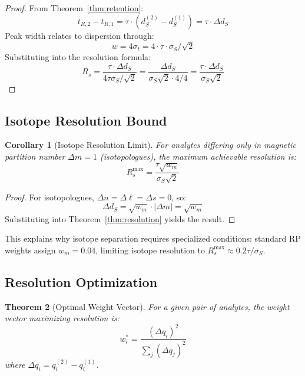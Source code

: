 \documentclass[twocolumn,10pt]{article}
\newtheorem{theorem}{Theorem}[section]
\newtheorem{corollary}[theorem]{Corollary}
\begin{document}
\begin{proof}
From Theorem~\ref{thm:retention}:
\begin{equation}
t_{R,2} - t_{R,1} = \tau \cdot (d_S^{(2)} - d_S^{(1)}) = \tau \cdot \Delta d_S
\end{equation}
Peak width relates to dispersion through:
\begin{equation}
w = 4\sigma_t = 4 \cdot \tau \cdot \sigma_S / \sqrt{2}
\end{equation}
Substituting into the resolution formula:
\begin{equation}
R_s = \frac{\tau \cdot \Delta d_S}{4 \tau \sigma_S / \sqrt{2}} = \frac{\Delta d_S}{\sigma_S \sqrt{2} \cdot 4/4} = \frac{\tau \cdot \Delta d_S}{\sigma_S \sqrt{2}}
\end{equation}
\end{proof}

\subsection{Isotope Resolution Bound}

\begin{corollary}[Isotope Resolution Limit]
\label{cor:isotope}
For analytes differing only in magnetic partition number $\Delta m = 1$ (isotopologues), the maximum achievable resolution is:
\begin{equation}
R_s^{\max} = \frac{\tau \sqrt{w_m}}{\sigma_S \sqrt{2}}
\end{equation}
\end{corollary}

\begin{proof}
For isotopologues, $\Delta n = \Delta \ell = \Delta s = 0$, so:
\begin{equation}
\Delta d_S = \sqrt{w_m} \cdot |\Delta m| = \sqrt{w_m}
\end{equation}
Substituting into Theorem~\ref{thm:resolution} yields the result.
\end{proof}

This explains why isotope separation requires specialized conditions: standard RP weights assign $w_m = 0.04$, limiting isotope resolution to $R_s^{\max} \approx 0.2 \tau/\sigma_S$.

\subsection{Resolution Optimization}

\begin{theorem}[Optimal Weight Vector]
\label{thm:optimal}
For a given pair of analytes, the weight vector maximizing resolution is:
\begin{equation}
w_i^* = \frac{(\Delta q_i)^2}{\sum_j (\Delta q_j)^2}
\end{equation}
where $\Delta q_i = q_i^{(2)} - q_i^{(1)}$.
\end{theorem}
\end{document}
